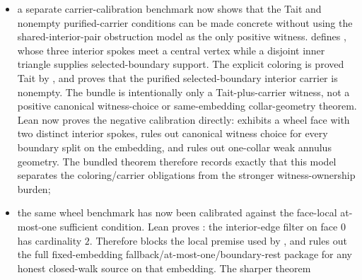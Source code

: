 \documentclass[11pt]{article}
\begin{document}
\begin{itemize}
honest-source geometry stack together with explicit-Tait Theorem~4.9 synthesis
already fails to force the projected nonempty endpoint generically on that
graph;
\item a separate carrier-calibration benchmark now shows that the Tait and
nonempty purified-carrier conditions can be made concrete without using the
shared-interior-pair obstruction model as the only positive witness.
 defines
, whose three interior spokes meet a central
vertex while a disjoint inner triangle supplies selected-boundary support.
The explicit coloring  is proved
Tait by , and
proves that the purified selected-boundary interior carrier is nonempty.  The
bundle
is intentionally only a Tait-plus-carrier witness, not a positive canonical
witness-choice or same-embedding collar-geometry theorem.  Lean now proves the
negative calibration directly:
exhibits a wheel face with two distinct interior spokes,
rules out canonical witness choice for every boundary split on the embedding,
and
rules out one-collar weak annulus geometry.  The bundled theorem
therefore records exactly that this model separates the coloring/carrier
obligations from the stronger witness-ownership burden;
\item the same wheel benchmark has now been calibrated against the face-local
at-most-one sufficient condition.  Lean proves
: the interior-edge
filter on face \(0\) has cardinality \(2\).  Therefore
 blocks the
local premise used by
,
and
rules out the full fixed-embedding fallback/at-most-one/boundary-rest package
for any honest closed-walk source on that embedding.  The sharper theorem

\end{itemize}
\end{document}
